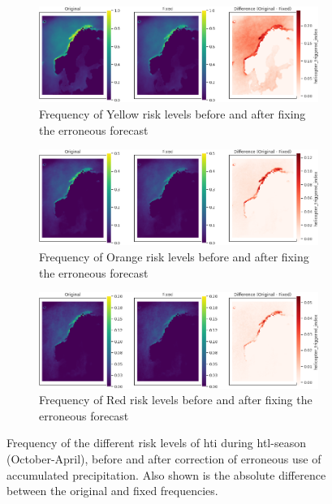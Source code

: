 \begin{figure}
\centering
\begin{subfigure}{\textwidth}
    \centering
    \includegraphics[width=\textwidth]{Figures/climatologyyellow.png}
    \caption{Frequency of Yellow risk levels before and after fixing the erroneous forecast}
    \label{fig:fixred}
\end{subfigure}

\begin{subfigure}{\textwidth}
    \centering
    \includegraphics[width=\textwidth]{Figures/climatologyorange.png}
    \caption{Frequency of Orange risk levels before and after fixing the erroneous forecast}
    \label{fig:fixorange}
\end{subfigure}

\begin{subfigure}{\textwidth}
    \centering
    \includegraphics[width=\textwidth]{Figures/climatologyred.png}
    \caption{Frequency of Red risk levels before and after fixing the erroneous forecast}
    \label{fig:fixyellow}
\end{subfigure}
\caption{Frequency of the different risk levels of \acrshort{hti} during \acrshort{htl}-season (October-April), before and after correction of erroneous use of accumulated precipitation. Also shown is the absolute difference between the original and fixed frequencies.}
\label{fig:climatfix}
\end{figure}

